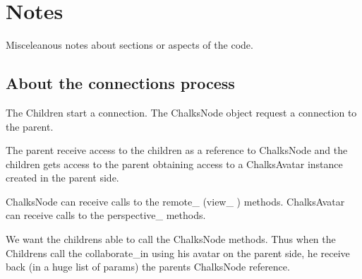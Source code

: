 \documentclass{report}
\begin{document}
\chapter{Notes}

Misceleanous notes about sections or aspects of the code.

\section{About the connections process}

The Children start a connection. The ChalksNode object request a connection to the parent. 

The parent receive access to the children as a reference to ChalksNode and the children gets access to the parent obtaining access to a ChalksAvatar instance created in the parent side.

ChalksNode can receive calls to the remote\_ (view\_ ) methods.
ChalksAvatar can receive calls to the perspective\_ methods.

We want the childrens able to call the ChalksNode methods. Thus when the Childrens call the collaborate\_in using his avatar on the parent side, he receive back (in a huge list of params) the parents ChalksNode reference.

\end{document}
